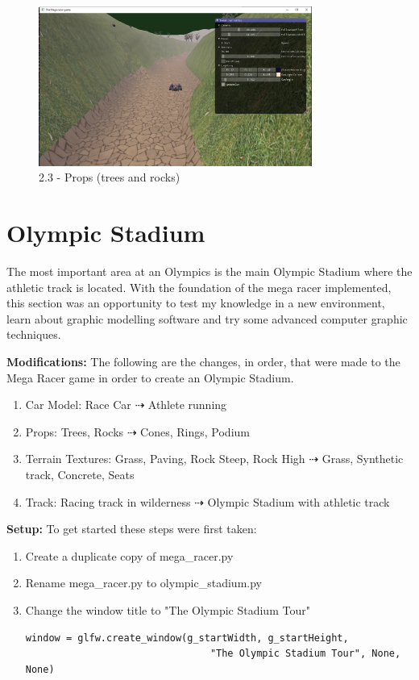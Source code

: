 \documentclass[a4 paper, 12pt]{article}
\begin{document}
    \begin{figure} [H]
        \centering
        \includegraphics[width=0.8\textwidth, frame]
            {./images/mega_racer/2.3.PNG}  
        \caption{2.3 - Props (trees and rocks)}   
    \end{figure}


\section{Olympic Stadium}
The most important area at an Olympics is the main Olympic Stadium where the athletic track is located. With the foundation of the mega racer implemented, this section was an opportunity to test my knowledge in a new environment, learn about graphic modelling software and try some advanced computer graphic techniques.

\textbf{Modifications:} The following are the changes, in order, that were made to the Mega Racer game in order to create an Olympic Stadium.
\begin{enumerate}
    \item Car Model: Race Car  $\dashrightarrow$ Athlete running    
    \item Props: Trees, Rocks $\dashrightarrow$ Cones, Rings, Podium
    \item Terrain Textures: Grass, Paving, Rock Steep, Rock High $\dashrightarrow$ Grass, Synthetic track, Concrete, Seats
    \item Track: Racing track in wilderness $\dashrightarrow$ Olympic Stadium with athletic track
\end{enumerate}

\textbf{Setup:} To get started these steps were first taken:
\begin{enumerate}
    \item Create a duplicate copy of mega\_racer.py
    \item Rename mega\_racer.py to olympic\_stadium.py
    \item Change the window title to "The Olympic Stadium Tour"

    \begin{lstlisting}
window = glfw.create_window(g_startWidth, g_startHeight, 
                                "The Olympic Stadium Tour", None, None)
\end{lstlisting}
\end{enumerate}
\end{document}
